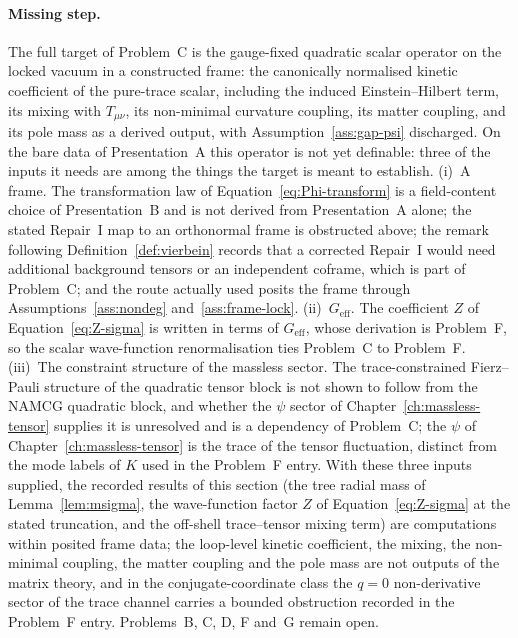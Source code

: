 \paragraph{Missing step.} The full target of Problem~C is the gauge-fixed quadratic scalar operator on the locked vacuum in a constructed frame: the canonically normalised kinetic coefficient of the pure-trace scalar, including the induced Einstein--Hilbert term, its mixing with \(T_{\mu\nu}\), its non-minimal curvature coupling, its matter coupling, and its pole mass as a derived output, with Assumption~\ref{ass:gap-psi} discharged. On the bare data of Presentation~A this operator is not yet definable: three of the inputs it needs are among the things the target is meant to establish. (i)~A frame. The transformation law of Equation~\eqref{eq:Phi-transform} is a field-content choice of Presentation~B and is not derived from Presentation~A alone; the stated Repair~I map to an orthonormal frame is obstructed above; the remark following Definition~\ref{def:vierbein} records that a corrected Repair~I would need additional background tensors or an independent coframe, which is part of Problem~C; and the route actually used posits the frame through Assumptions~\ref{ass:nondeg} and~\ref{ass:frame-lock}. (ii)~\(G_{\mathrm{eff}}\). The coefficient \(Z\) of Equation~\eqref{eq:Z-sigma} is written in terms of \(G_{\mathrm{eff}}\), whose derivation is Problem~F, so the scalar wave-function renormalisation ties Problem~C to Problem~F. (iii)~The constraint structure of the massless sector. The trace-constrained Fierz--Pauli structure of the quadratic tensor block is not shown to follow from the NAMCG quadratic block, and whether the \(\psi\) sector of Chapter~\ref{ch:massless-tensor} supplies it is unresolved and is a dependency of Problem~C; the \(\psi\) of Chapter~\ref{ch:massless-tensor} is the trace of the tensor fluctuation, distinct from the mode labels of \(K\) used in the Problem~F entry. With these three inputs supplied, the recorded results of this section (the tree radial mass of Lemma~\ref{lem:msigma}, the wave-function factor \(Z\) of Equation~\eqref{eq:Z-sigma} at the stated truncation, and the off-shell trace--tensor mixing term) are computations within posited frame data; the loop-level kinetic coefficient, the mixing, the non-minimal coupling, the matter coupling and the pole mass are not outputs of the matrix theory, and in the conjugate-coordinate class the \(q=0\) non-derivative sector of the trace channel carries a bounded obstruction recorded in the Problem~F entry.
Problems~B, C, D, F and~G remain open.

